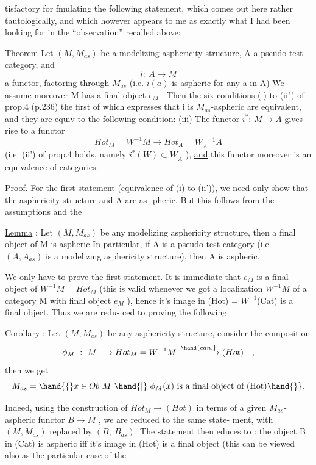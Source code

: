 tisfactory for fmulating the following statement,  which comes out here
rather tautologically,  and which however appears to me as exactly what
I had been looking for in the ``observation'' recalled above:

\uline{Theorem} Let $(M,M_{as})$  be a \uline{modelizing} asphericity structure,   A a
 pseudo-test category,  and
\[ i:\ A \longrightarrow M \]
a functor,  factoring through $M_{as}$  (i.e. $i(a)$ is aspheric for any a in A)
\uline{We assume moreover M has a final object $e_M$ .}\hand{)}
\hand{(}Then the six conditions (i) to (ii") of prop.4  (p.236)\hand{,} \hand{(}the first
of which expresses that i is $M_{as}$-aspheric\hand{)} are equivalent,  and they are
equiv to the following condition:
  (iii)  The functor  $i^{*}$: $M \to A\hat{}$ gives rise to a functor
\[ Hot_M = W^{-1}M \longrightarrow Hot_A = \underline{W}_A{}^{-1}A\hat{} \]
(i.e.  (ii') of prop.4 holds,  namely  $i^{*}(W) \subset \underline{W}_A$ ),  \uline{and}  this functor
moreover is an equivalence of categories.

Proof.  For the first statement (equivalence of  (i) to
(ii')),  we need only show that the asphericity structure  and A are as-%
pheric.  But  this follows from the assumptions and  the

\uline{Lemma} : Let $(M,M_{as})$  be any modelizing asphericity structure,  then a
final object of M is aspheric In particular,  if A is a pseudo-test
category (i.e.  $(A\hat{},A\hat{}_{as})$  is a modelizing asphericity structure),  then A
is aspheric.

We only have to prove the first statement.   It is immediate
that $e_M$  is a final object of $W^{-1}M = Hot_M$  (this is valid whenever we
got a localization $W^{-1}M$  of a category M with final object $e_M$ ),  hence
it's image in (Hot) = $\underline{W}^{-1}$(Cat)  is a final object.  Thus we are redu-%
ced to proving the following

\uline{Corollary} :  Let $(M,M_{as})$ be any asphericity structure,  consider the
composition
\[ \phi_M\ :\ M \longrightarrow Hot_M = W^{-1}M \xrightarrow{\hand{can.}} (Hot) \quad , \]
then we get
\[ M_{as} = \hand{\{} x \in Ob\ M \ \hand{|}\ \phi_M(x) \text{ is a final object of (Hot)}\hand{\}}. \]

Indeed,  using the construction of  $Hot_M \longrightarrow (Hot)$  in terms of a
given $M_{as}$-aspheric functor  $B \to M$ ,  we are reduced to the same state-%
ment,  with $(M,M_{as})$  replaced by $(B\hat{},\ B\hat{}_{as})$.  The statement then educes
to :  the object B in (Cat)  is aspheric iff it's image in (Hot) is a
final object  (this can be viewed also as the particular case of the
